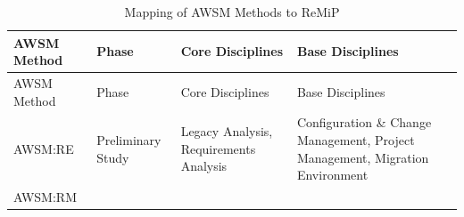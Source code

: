 \hypertarget{tbl:awsm-remip}{}
\begin{longtable}[]{@{}llll@{}}
\caption{\label{tbl:awsm-remip}Mapping of AWSM Methods to ReMiP}\tabularnewline
\toprule
\begin{minipage}[b]{0.07\columnwidth}\raggedright
AWSM Method\strut
\end{minipage} & \begin{minipage}[b]{0.15\columnwidth}\raggedright
Phase\strut
\end{minipage} & \begin{minipage}[b]{0.26\columnwidth}\raggedright
Core Disciplines\strut
\end{minipage} & \begin{minipage}[b]{0.41\columnwidth}\raggedright
Base Disciplines\strut
\end{minipage}\tabularnewline
\midrule
\endfirsthead
\toprule
\begin{minipage}[b]{0.07\columnwidth}\raggedright
AWSM Method\strut
\end{minipage} & \begin{minipage}[b]{0.15\columnwidth}\raggedright
Phase\strut
\end{minipage} & \begin{minipage}[b]{0.26\columnwidth}\raggedright
Core Disciplines\strut
\end{minipage} & \begin{minipage}[b]{0.41\columnwidth}\raggedright
Base Disciplines\strut
\end{minipage}\tabularnewline
\midrule
\endhead
\begin{minipage}[t]{0.07\columnwidth}\raggedright
AWSM:RE\strut
\end{minipage} & \begin{minipage}[t]{0.15\columnwidth}\raggedright
Preliminary Study\strut
\end{minipage} & \begin{minipage}[t]{0.26\columnwidth}\raggedright
Legacy Analysis, Requirements Analysis\strut
\end{minipage} & \begin{minipage}[t]{0.41\columnwidth}\raggedright
Configuration \& Change Management, Project Management, Migration Environment\strut
\end{minipage}\tabularnewline
\begin{minipage}[t]{0.07\columnwidth}\raggedright
AWSM:RM\strut
\end{minipage} & \begin{minipage}[t]{0.15\columnwidth}\raggedright

\end{minipage}
\end{longtable}
